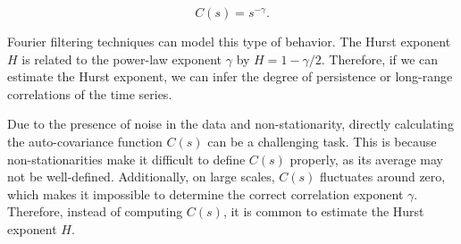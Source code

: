 $$C(s) = s^{-\gamma}.$$
 
Fourier filtering techniques can model this type of behavior. The Hurst exponent $H$ is related to the power-law exponent $\gamma$ by $H=1-\gamma/2$. Therefore, if we can estimate the Hurst exponent, we can infer the degree of persistence or long-range correlations of the time series.








Due to the presence of noise in the data and non-stationarity, directly calculating the auto-covariance function $C(s)$ can be a challenging task. This is because non-stationarities make it difficult to define $C(s)$ properly, as its average may not be well-defined. Additionally, on large scales, $C(s)$ fluctuates around zero, which makes it impossible to determine the correct correlation exponent $\gamma$. Therefore, instead of computing $C(s)$, it is common to estimate the Hurst exponent $H$.

